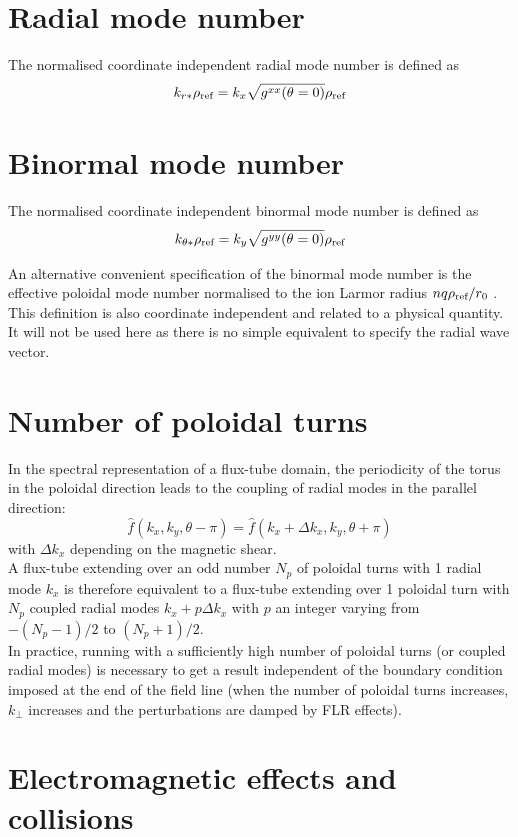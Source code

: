 \documentclass[fleqn]{report}
\begin{document}
\section{Radial mode number}
The normalised coordinate independent radial mode number is defined as
\begin{equation}
 k_{r*}\rho_{\textrm{ref}} = k_x \sqrt{g^{xx}(\theta=0)} \rho_{\textrm{ref}}
\end{equation}

\section{Binormal mode number}
The normalised coordinate independent binormal mode number is defined as
\begin{equation}
 k_{\theta*}\rho_{\textrm{ref}} = k_y \sqrt{g^{yy}(\theta=0)} \rho_{\textrm{ref}}
\end{equation}

An alternative convenient specification of the binormal mode number is the effective poloidal mode number normalised to the ion Larmor radius  $nq\rho_{\textrm{ref}}/r_0$  \cite{Merlo:PoP2016}. This definition is also coordinate independent and related to a physical quantity. It will not be used here as there is no simple equivalent to specify the radial wave vector.

\section{Number of poloidal turns}
In the spectral representation of a flux-tube domain, the periodicity of the torus in the poloidal direction leads to the coupling of radial modes in the parallel direction:
$$\hat{f}(k_x,k_y,\theta-\pi)=\hat{f}(k_x+\Delta k_x,k_y,\theta+\pi)$$
with $\Delta k_x$ depending on the magnetic shear.\\
A flux-tube extending over an odd number $N_p$ of poloidal turns with 1 radial mode $k_x$ is therefore equivalent to a flux-tube extending over 1 poloidal turn with $N_p$ coupled radial modes $k_x + p\Delta k_x$ with $p$ an integer varying from $-(N_p-1)/2$ to $(N_p+1)/2$.\\ 
In practice, running with a sufficiently high number of poloidal turns (or coupled radial modes) is necessary to get a result independent of the boundary condition imposed at the end of the field line (when the number of poloidal turns increases, $k_\perp$ increases and the perturbations are damped by FLR effects). 

\section{Electromagnetic effects and collisions}
\end{document}
